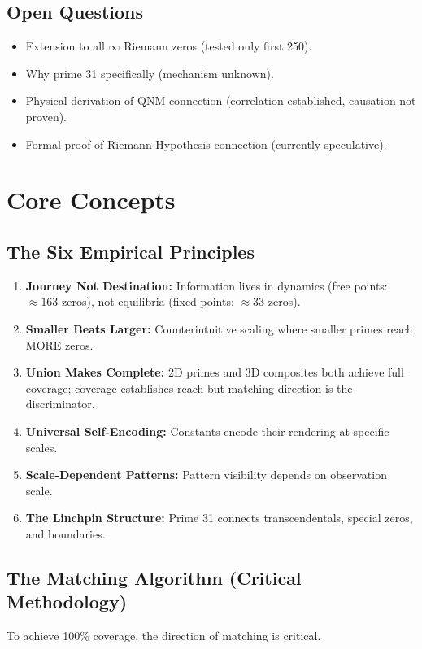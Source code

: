 \documentclass[11pt, a4paper]{article}
\begin{document}
\subsection{Open Questions}
\begin{itemize}
    \item[?] Extension to all $\infty$ Riemann zeros (tested only first 250).
    \item[?] Why prime 31 specifically (mechanism unknown).
    \item[?] Physical derivation of QNM connection (correlation established, causation not proven).
    \item[?] Formal proof of Riemann Hypothesis connection (currently speculative).
\end{itemize}

\section{Core Concepts}

\subsection{The Six Empirical Principles}
\begin{enumerate}
    \item \textbf{Journey Not Destination:} Information lives in dynamics (free points: $\approx 163$ zeros), not equilibria (fixed points: $\approx 33$ zeros).
    \item \textbf{Smaller Beats Larger:} Counterintuitive scaling where smaller primes reach MORE zeros.
    \item \textbf{Union Makes Complete:} 2D primes and 3D composites both achieve full coverage; coverage establishes reach but matching direction is the discriminator.
    \item \textbf{Universal Self-Encoding:} Constants encode their rendering at specific scales.
    \item \textbf{Scale-Dependent Patterns:} Pattern visibility depends on observation scale.
    \item \textbf{The Linchpin Structure:} Prime 31 connects transcendentals, special zeros, and boundaries.
\end{enumerate}

\subsection{The Matching Algorithm (Critical Methodology)}
To achieve 100\% coverage, the direction of matching is critical.
\end{document}
